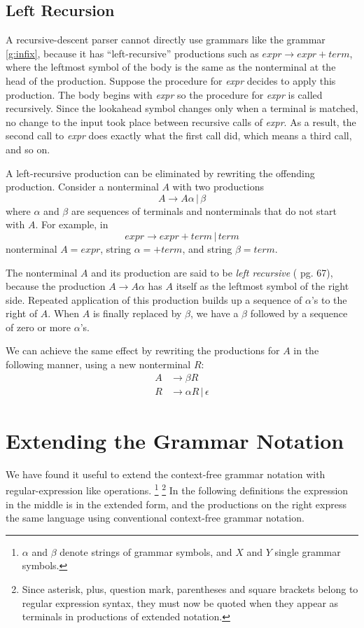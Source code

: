 \documentclass[a4paper,oneside,11pt]{book}
\theoremstyle{definition}
\begin{document}
\clearpage
\subsection{Left Recursion}

A recursive-descent parser cannot directly use grammars like the grammar \ref{g:infix}, because it has ``left-recursive'' productions
such as $expr \rightarrow expr + term$, where the leftmost symbol of the body is the same as the nonterminal at the head of
the production. Suppose the procedure for \emph{expr} decides to apply this production. The body begins with \emph{expr} so
the procedure for \emph{expr} is called recursively. Since the lookahead symbol changes only when a terminal is matched,
no change to the input took place between recursive calls of \emph{expr}. As a result, the second call to \emph{expr} does
exactly what the first call did, which means a third call, and so on.

A left-recursive production can be eliminated by rewriting the offending production.
Consider a nonterminal $A$ with two productions $$A \rightarrow A\alpha \,|\, \beta$$
where $\alpha$ and $\beta$ are sequences of terminals and nonterminals that do not start with $A$.
For example, in $$expr \rightarrow expr + term \, | \, term$$ nonterminal $A = expr$, string $\alpha = + term$, and string $\beta = term$.

The nonterminal $A$ and its production are said to be \emph{left recursive} (\cite{COMPILERS} pg. 67), because the production $A \rightarrow A\alpha$
has $A$ itself as the leftmost symbol of the right side. Repeated application of this production builds up a sequence of $\alpha$'s
to the right of $A$. When $A$ is finally replaced by $\beta$, we have a $\beta$ followed by a sequence of zero or more $\alpha$'s.

We can achieve the same effect by rewriting the productions for $A$ in the following manner, using a new nonterminal $R$:
\begin{align*}
A &\rightarrow \beta R\\
R &\rightarrow \alpha R \,|\, \epsilon
\end{align*}


\section{Extending the Grammar Notation}

We have found it useful to extend the context-free grammar notation with regular-expression like operations.
\footnote{$\alpha$ and $\beta$ denote strings of grammar symbols, and $X$ and $Y$ single grammar symbols.}
\footnote{Since asterisk, plus, question mark, parentheses and square brackets belong to regular expression syntax,
they must now be quoted when they appear as terminals in productions of extended notation.}
In the following definitions the expression in the middle is in the extended form, and the productions on the right
express the same language using conventional context-free grammar notation.
\end{document}
